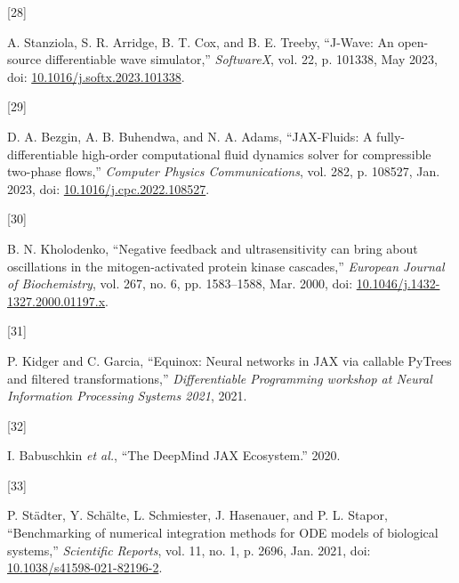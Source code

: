 \documentclass[
]{article}
\newlength{\cslhangindent}
\newlength{\csllabelwidth}
\newlength{\cslentryspacingunit} %
\newenvironment{CSLReferences}[2] %
 {%
  \setlength{\parindent}{0pt}
  \ifodd #1
  \let\oldpar\par
  \def\par{\hangindent=\cslhangindent\oldpar}
  \fi
  \setlength{\parskip}{#2\cslentryspacingunit}
 }%
 {}
\newcommand{\CSLLeftMargin}[1]{\parbox[t]{\csllabelwidth}{#1}}
\newcommand{\CSLRightInline}[1]{\parbox[t]{\linewidth - \csllabelwidth}{#1}\break}
\begin{document}
\begin{CSLReferences}{0}{0}
\leavevmode{}%
\CSLLeftMargin{{[}28{]} }%
\CSLRightInline{A. Stanziola, S. R. Arridge, B. T. Cox, and B. E.
Treeby, {``J-{Wave}: {An} open-source differentiable wave simulator,''}
\emph{SoftwareX}, vol. 22, p. 101338, May 2023, doi:
\href{https://doi.org/10.1016/j.softx.2023.101338}{10.1016/j.softx.2023.101338}.}

\leavevmode{}%
\CSLLeftMargin{{[}29{]} }%
\CSLRightInline{D. A. Bezgin, A. B. Buhendwa, and N. A. Adams,
{``{JAX-Fluids}: {A} fully-differentiable high-order computational fluid
dynamics solver for compressible two-phase flows,''} \emph{Computer
Physics Communications}, vol. 282, p. 108527, Jan. 2023, doi:
\href{https://doi.org/10.1016/j.cpc.2022.108527}{10.1016/j.cpc.2022.108527}.}

\leavevmode{}%
\CSLLeftMargin{{[}30{]} }%
\CSLRightInline{B. N. Kholodenko, {``Negative feedback and
ultrasensitivity can bring about oscillations in the mitogen-activated
protein kinase cascades,''} \emph{European Journal of Biochemistry},
vol. 267, no. 6, pp. 1583--1588, Mar. 2000, doi:
\href{https://doi.org/10.1046/j.1432-1327.2000.01197.x}{10.1046/j.1432-1327.2000.01197.x}.}

\leavevmode{}%
\CSLLeftMargin{{[}31{]} }%
\CSLRightInline{P. Kidger and C. Garcia, {``Equinox: Neural networks in
{JAX} via callable {PyTrees} and filtered transformations,''}
\emph{Differentiable Programming workshop at Neural Information
Processing Systems 2021}, 2021.}

\leavevmode{}%
\CSLLeftMargin{{[}32{]} }%
\CSLRightInline{I. Babuschkin \emph{et al.}, {``The {DeepMind JAX
Ecosystem}.''} 2020.}

\leavevmode{}%
\CSLLeftMargin{{[}33{]} }%
\CSLRightInline{P. Städter, Y. Schälte, L. Schmiester, J. Hasenauer, and
P. L. Stapor, {``Benchmarking of numerical integration methods for {ODE}
models of biological systems,''} \emph{Scientific Reports}, vol. 11, no.
1, p. 2696, Jan. 2021, doi:
\href{https://doi.org/10.1038/s41598-021-82196-2}{10.1038/s41598-021-82196-2}.}

\end{CSLReferences}
\end{document}

